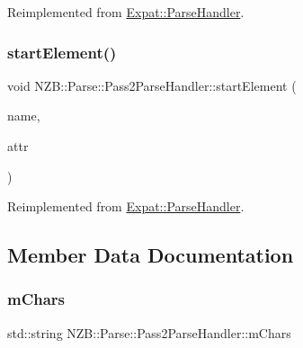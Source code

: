 Reimplemented from \hyperlink{class_expat_1_1_parse_handler_a13c775fa36138b4ee429e10b93177bec}{Expat\+::\+Parse\+Handler}.

\hypertarget{class_n_z_b_1_1_parse_1_1_pass2_parse_handler_a2b3ab039352b1bf106d795188d0cd4c1}{}\label{class_n_z_b_1_1_parse_1_1_pass2_parse_handler_a2b3ab039352b1bf106d795188d0cd4c1} 
\subsubsection{\texorpdfstring{start\+Element()}{startElement()}}
{\footnotesize\ttfamily void N\+Z\+B\+::\+Parse\+::\+Pass2\+Parse\+Handler\+::start\+Element (\begin{DoxyParamCaption}\item[{const X\+M\+L\+\_\+\+Char $\ast$}]{name,  }\item[{const X\+M\+L\+\_\+\+Char $\ast$$\ast$}]{attr }\end{DoxyParamCaption})\hspace{0.3cm}{\ttfamily [virtual]}}



Reimplemented from \hyperlink{class_expat_1_1_parse_handler_aa6b631d6e771281fb965881545ebacfa}{Expat\+::\+Parse\+Handler}.



\subsection{Member Data Documentation}
\hypertarget{class_n_z_b_1_1_parse_1_1_pass2_parse_handler_a3e2bb4640047a0aa35ab93fb1a25465b}{}\label{class_n_z_b_1_1_parse_1_1_pass2_parse_handler_a3e2bb4640047a0aa35ab93fb1a25465b} 
\subsubsection{\texorpdfstring{m\+Chars}{mChars}}
{\footnotesize\ttfamily std\+::string N\+Z\+B\+::\+Parse\+::\+Pass2\+Parse\+Handler\+::m\+Chars\hspace{0.3cm}{\ttfamily [protected]}}

